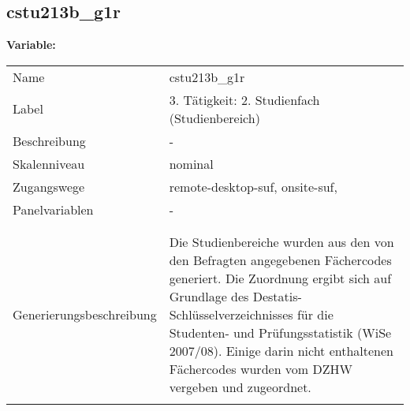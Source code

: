 	
	
	\subsection{cstu213b\_g1r}
	\label{subSection:cstu213b_g1r}

	\noindent\textbf{Variable:}\\
		\begin{tabular}{lL{11.3cm}}
			\label{tableVariable:cstu213b_g1r}
			Name & cstu213b\_g1r \\
			Label & 3. Tätigkeit: 2. Studienfach (Studienbereich) \\
			Beschreibung & - \\
			Skalenniveau & nominal \\
			Zugangswege &
				remote-desktop-suf,
				onsite-suf,
 \\
			Panelvariablen & -
			 \\
			 \\
 \\
					Generierungsbeschreibung & Die Studienbereiche wurden aus den von den Befragten angegebenen Fächercodes generiert. Die Zuordnung ergibt sich auf Grundlage des Destatis-Schlüsselverzeichnisses für die Studenten- und Prüfungsstatistik (WiSe 2007/08). Einige darin nicht enthaltenen Fächercodes wurden vom DZHW vergeben und zugeordnet. 
				 \\	
			 \\
		\end{tabular}






